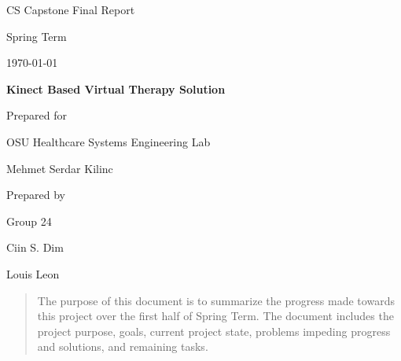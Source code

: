\documentclass[onecolumn, draftclsnofoot,10pt, compsoc]{IEEEtran}
\def \CapstoneTeamName{     TeamName}
\def \CapstoneTeamNumber{       24}
\def \GroupMemberOne{            Ciin S. Dim}
\def \GroupMemberTwo{           Louis Leon}
\def \CapstoneProjectName{      Kinect Based Virtual Therapy Solution}
\def \CapstoneSponsorCompany{   OSU Healthcare Systems Engineering Lab}
\def \CapstoneSponsorPerson{        Mehmet Serdar Kilinc}
\def \DocType{      %
                Final Report
                }
\newcommand{\NameSigPair}[1]{\par
\makebox[2.75in][r]{#1} \hfil   \makebox[3.25in]{\makebox[2.25in]{\hrulefill} \hfill        \makebox[.75in]{\hrulefill}}
\par\vspace{-12pt} \textit{\tiny\noindent
\makebox[2.75in]{} \hfil        \makebox[3.25in]{\makebox[2.25in][r]{Signature} \hfill  \makebox[.75in][r]{Date}}}}
\renewcommand{\NameSigPair}[1]{#1}
\begin{document}
\begin{titlepage}
    \begin{singlespace}
        \hfill 
        \par\vspace{.2in}
        \centering
        \scshape{
            \huge CS Capstone\DocType \par
            {\large Spring Term}\par
            {\large\today}\par
            \vspace{.5in}
            \textbf{\Huge\CapstoneProjectName}\par
            \vfill
            {\large Prepared for}\par
            \Huge \CapstoneSponsorCompany\par
            \vspace{5pt}
            {\Large\NameSigPair{\CapstoneSponsorPerson}\par}
            {\large Prepared by }\par
            Group\CapstoneTeamNumber\par
            \vspace{5pt}
            {\Large
                \NameSigPair{\GroupMemberOne}\par
                \NameSigPair{\GroupMemberTwo}\par
            }
            \vspace{20pt}
        }
        \begin{abstract}
        The purpose of this document is to summarize the progress made towards this project over the first half of Spring Term. The document includes the project purpose, goals, current project state, problems impeding progress and solutions, and remaining tasks.
    \end{abstract}     
    \end{singlespace}
\end{titlepage}
\newpage
{}
\tableofcontents
\listoffigures
\clearpage
\end{document}
